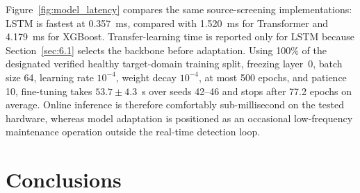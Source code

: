 \documentclass[a4paper,10pt]{cas-sc}%
\newenvironment{revision}{\color{revisionred}}{}
\begin{document}
\begin{revision}
	Figure~\ref{fig:model_latency} compares the same source-screening implementations: LSTM is fastest at 0.357~ms, compared with 1.520~ms for Transformer and 4.179~ms for XGBoost. Transfer-learning time is reported only for LSTM because Section~\ref{sec:6.1} selects the backbone before adaptation. Using 100\% of the designated verified healthy target-domain training split, freezing layer~0, batch size 64, learning rate $10^{-4}$, weight decay $10^{-4}$, at most 500 epochs, and patience 10, fine-tuning takes $53.7\pm4.3$~s over seeds 42--46 and stops after 77.2 epochs on average. Online inference is therefore comfortably sub-millisecond on the tested hardware, whereas model adaptation is positioned as an occasional low-frequency maintenance operation outside the real-time detection loop.
\end{revision}



\section{Conclusions}\label{sec:7}
\end{document}
